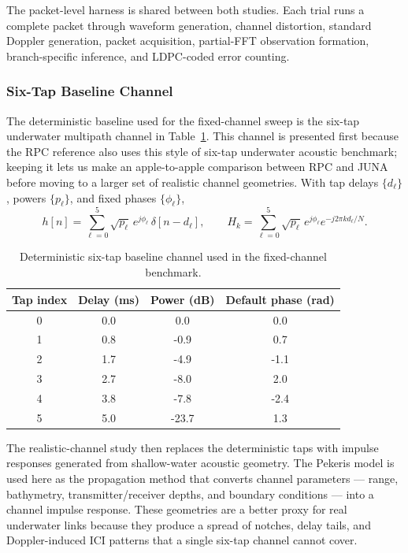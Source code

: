 \documentclass{wileysev}
\begin{document}
	The packet-level harness is shared between both studies. Each trial runs a complete packet through waveform generation, channel distortion, standard Doppler generation, packet acquisition, partial-FFT observation formation, branch-specific inference, and LDPC-coded error counting.
	
	\subsubsection{Six-Tap Baseline Channel}
	
	The deterministic baseline used for the fixed-channel sweep is the six-tap underwater multipath channel in Table~\ref{tab:paper_channel_taps}. This channel is presented first because the RPC reference also uses this style of six-tap underwater acoustic benchmark; keeping it lets us make an apple-to-apple comparison between RPC and JUNA before moving to a larger set of realistic channel geometries. With tap delays \(\{d_\ell\}\), powers \(\{p_\ell\}\), and fixed phases \(\{\phi_\ell\}\),
	\begin{equation}
		h[n]
		=
		\sum_{\ell=0}^{5}
		\sqrt{p_\ell}\, e^{j\phi_\ell}\,\delta[n-d_\ell],
		\qquad
		H_k
		=
		\sum_{\ell=0}^{5}
		\sqrt{p_\ell}\, e^{j\phi_\ell} e^{-j2\pi k d_\ell/N}.
		\label{eq:sim_H_from_taps}
	\end{equation}
	
	\begin{table}[H]
		\centering
		\caption{Deterministic six-tap baseline channel used in the fixed-channel benchmark.}
		\label{tab:paper_channel_taps}
		\begin{tabular}{cccc}
			\toprule
			Tap index & Delay (ms) & Power (dB) & Default phase (rad) \\
			\midrule
			0 & 0.0 & 0.0 & 0.0 \\
			1 & 0.8 & -0.9 & 0.7 \\
			2 & 1.7 & -4.9 & -1.1 \\
			3 & 2.7 & -8.0 & 2.0 \\
			4 & 3.8 & -7.8 & -2.4 \\
			5 & 5.0 & -23.7 & 1.3 \\
			\bottomrule
		\end{tabular}
	\end{table}
	
	The realistic-channel study then replaces the deterministic taps with impulse responses generated from shallow-water acoustic geometry. The Pekeris model is used here as the propagation method that converts channel parameters --- range, bathymetry, transmitter/receiver depths, and boundary conditions --- into a channel impulse response. These geometries are a better proxy for real underwater links because they produce a spread of notches, delay tails, and Doppler-induced ICI patterns that a single six-tap channel cannot cover.
	
\end{document}
